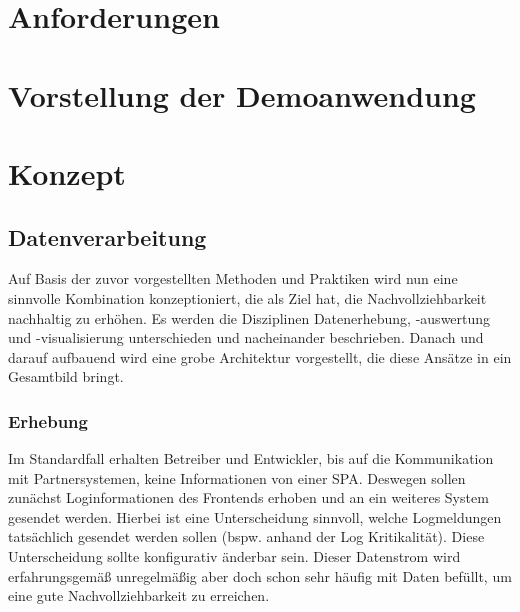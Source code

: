 	
\section{Anforderungen}

	
\section{Vorstellung der Demoanwendung}

	
\newpage
	
\section{Konzept}
	
	\subsection{Datenverarbeitung}

	Auf Basis der zuvor vorgestellten Methoden und Praktiken wird nun eine sinnvolle Kombination konzeptioniert, die als Ziel hat, die Nachvollziehbarkeit nachhaltig zu erhöhen. Es werden die Disziplinen Datenerhebung, -auswertung und -visualisierung unterschieden und nacheinander beschrieben. Danach und darauf aufbauend wird eine grobe Architektur vorgestellt, die diese Ansätze in ein Gesamtbild bringt.
		
	\subsubsection{Erhebung}
		
	Im Standardfall erhalten Betreiber und Entwickler, bis auf die Kommunikation mit Partnersystemen, keine Informationen von einer SPA. Deswegen sollen zunächst Loginformationen des Frontends erhoben und an ein weiteres System gesendet werden. Hierbei ist eine Unterscheidung sinnvoll, welche Logmeldungen tatsächlich gesendet werden sollen (bspw. anhand der Log Kritikalität). Diese Unterscheidung sollte konfigurativ änderbar sein. Dieser Datenstrom wird erfahrungsgemäß unregelmäßig aber doch schon sehr häufig mit Daten befüllt, um eine gute Nachvollziehbarkeit zu erreichen.
		
